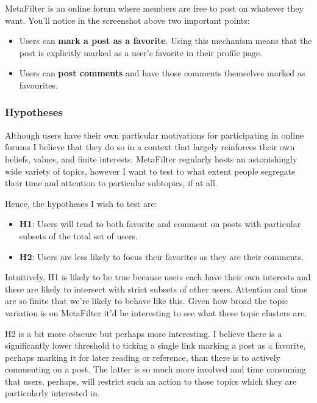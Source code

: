 MetaFilter is an online forum where members are free to post on whatever
they want. You'll notice in the screenshot above two important points:

\begin{itemize}
\item
  Users can \textbf{mark a post as a favorite}. Using this mechanism
  means that the post is explicitly marked as a user's favorite in their
  profile page.
\item
  Users can \textbf{post comments} and have those comments themselves
  marked as favourites.
\end{itemize}

\subsubsection{Hypotheses}

Although users have their own particular motivations for participating
in online forums I believe that they do so in a context that largely
reinforces their own beliefs, values, and finite interests. MetaFilter
regularly hosts an astonishingly wide variety of topics, however I want
to test to what extent people segregate their time and attention to
particular subtopics, if at all.

Hence, the hypotheses I wish to test are:

\begin{itemize}
\item
  \textbf{H1}: Users will tend to both favorite and comment on posts
  with particular subsets of the total set of users.
\item
  \textbf{H2}: Users are less likely to focus their favorites as they
  are their comments.
\end{itemize}

Intuitively, H1 is likely to be true because users each have their own
interests and these are likely to intersect with strict subsets of other
users. Attention and time are so finite that we're likely to behave like
this. Given how broad the topic variation is on MetaFilter it'd be
interesting to see what these topic clusters are.

H2 is a bit more obscure but perhaps more interesting. I believe there
is a significantly lower threshold to ticking a single link marking a
post as a favorite, perhaps marking it for later reading or reference,
than there is to actively commenting on a post. The latter is so much
more involved and time consuming that users, perhaps, will restrict such
an action to those topics which they are particularly interested in.

